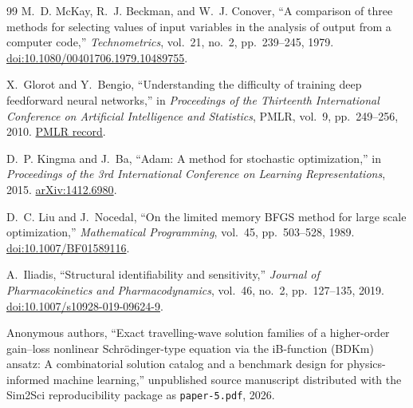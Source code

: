 \documentclass[11pt]{article}
\begin{document}
\begin{thebibliography}{99}
M.~D. McKay, R.~J. Beckman, and W.~J. Conover,
``A comparison of three methods for selecting values of input variables in
the analysis of output from a computer code,'' \emph{Technometrics},
vol.~21, no.~2, pp.~239--245, 1979.
\href{https://doi.org/10.1080/00401706.1979.10489755}{doi:10.1080/00401706.1979.10489755}.

X.~Glorot and Y.~Bengio,
``Understanding the difficulty of training deep feedforward neural networks,''
in \emph{Proceedings of the Thirteenth International Conference on Artificial
Intelligence and Statistics}, PMLR, vol.~9, pp.~249--256, 2010.
\href{https://proceedings.mlr.press/v9/glorot10a.html}{PMLR record}.

D.~P. Kingma and J.~Ba,
``Adam: A method for stochastic optimization,'' in
\emph{Proceedings of the 3rd International Conference on Learning
Representations}, 2015.
\href{https://arxiv.org/abs/1412.6980}{arXiv:1412.6980}.

D.~C. Liu and J.~Nocedal,
``On the limited memory BFGS method for large scale optimization,''
\emph{Mathematical Programming}, vol.~45, pp.~503--528, 1989.
\href{https://doi.org/10.1007/BF01589116}{doi:10.1007/BF01589116}.

A.~Iliadis,
``Structural identifiability and sensitivity,''
\emph{Journal of Pharmacokinetics and Pharmacodynamics}, vol.~46, no.~2,
pp.~127--135, 2019.
\href{https://doi.org/10.1007/s10928-019-09624-9}{doi:10.1007/s10928-019-09624-9}.

Anonymous authors,
``Exact travelling-wave solution families of a higher-order gain--loss
nonlinear Schr\"odinger-type equation via the iB-function (BDKm) ansatz: A
combinatorial solution catalog and a benchmark design for physics-informed
machine learning,'' unpublished source manuscript distributed with the
Sim2Sci reproducibility package as \texttt{paper-5.pdf}, 2026.

\end{thebibliography}
\end{document}
